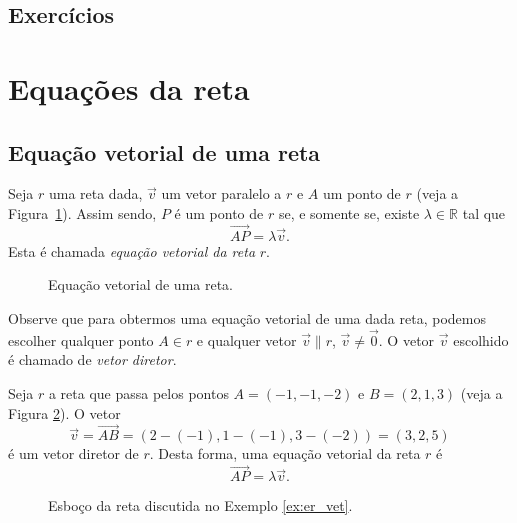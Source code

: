 \subsection*{Exercícios}

\emconstrucao

\section{Equações da reta}\label{cap_ert_sec_eqsreta}

\subsection{Equação vetorial de uma reta}

Seja $r$ uma reta dada, $\vec{v}$ um vetor paralelo a $r$ e $A$ um ponto de $r$ (veja a Figura~\ref{fig:er_vet}). Assim sendo, $P$ é um ponto de $r$ se, e somente se, existe $\lambda\in\mathbb{R}$ tal que
\begin{equation}
  \overrightarrow{AP} = \lambda\vec{v}.
\end{equation}
Esta é chamada \emph{equação vetorial da reta} $r$.

\begin{figure}[H]
  \centering
  \caption{Equação vetorial de uma reta.}
  \label{fig:er_vet}
\end{figure}

Observe que para obtermos uma equação vetorial de uma dada reta, podemos escolher qualquer ponto $A\in r$ e qualquer vetor $\vec{v}\parallel r$, $\vec{v}\neq\vec{0}$. O vetor $\vec{v}$ escolhido é chamado de \emph{vetor diretor}.

\begin{ex}\label{ex:er_vet}
  Seja $r$ a reta que passa pelos pontos $A=(-1,-1,-2)$ e $B = (2,1,3)$ (veja a Figura \ref{fig:ex_er_vet}). O vetor
  \begin{equation}
    \vec{v} = \overrightarrow{AB} = (2-(-1),1-(-1),3-(-2)) = (3,2,5)
  \end{equation}
  é um vetor diretor de $r$. Desta forma, uma equação vetorial da reta $r$ é
  \begin{equation}
    \overrightarrow{AP} = \lambda\vec{v}.
  \end{equation}
  \begin{figure}[H]
    \centering
    \caption{Esboço da reta discutida no Exemplo \ref{ex:er_vet}.}
    \label{fig:ex_er_vet}
  \end{figure}  
\end{ex}

